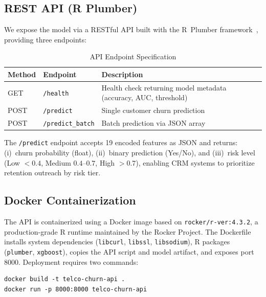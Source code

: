 \documentclass[10pt, conference, letterpaper]{IEEEtran}
\begin{document}
\subsection{REST API (R Plumber)}

We expose the model via a RESTful API built with the R~Plumber framework~\cite{plumber2023}, providing three endpoints:

\begin{table}[htbp]
\caption{API Endpoint Specification}
\label{tab:api}
\begin{center}
\begin{tabular}{@{}llp{3.5cm}@{}}
\toprule
\textbf{Method} & \textbf{Endpoint} & \textbf{Description} \\
\midrule
GET  & \texttt{/health}         & Health check returning model metadata (accuracy, AUC, threshold) \\
POST & \texttt{/predict}        & Single customer churn prediction \\
POST & \texttt{/predict\_batch} & Batch prediction via JSON array \\
\bottomrule
\end{tabular}
\end{center}
\end{table}

The \texttt{/predict} endpoint accepts 19 encoded features as JSON and returns: (i)~churn probability (float), (ii)~binary prediction (Yes/No), and (iii)~risk level (Low $< 0.4$, Medium $0.4$--$0.7$, High $> 0.7$), enabling CRM systems to prioritize retention outreach by risk tier.

\subsection{Docker Containerization}

The API is containerized using a Docker image based on \texttt{rocker/r-ver:4.3.2}, a production-grade R runtime maintained by the Rocker Project. The Dockerfile installs system dependencies (\texttt{libcurl}, \texttt{libssl}, \texttt{libsodium}), R packages (\texttt{plumber}, \texttt{xgboost}), copies the API script and model artifact, and exposes port 8000. Deployment requires two commands:

\begin{verbatim}
docker build -t telco-churn-api .
docker run -p 8000:8000 telco-churn-api
\end{verbatim}

\end{document}
